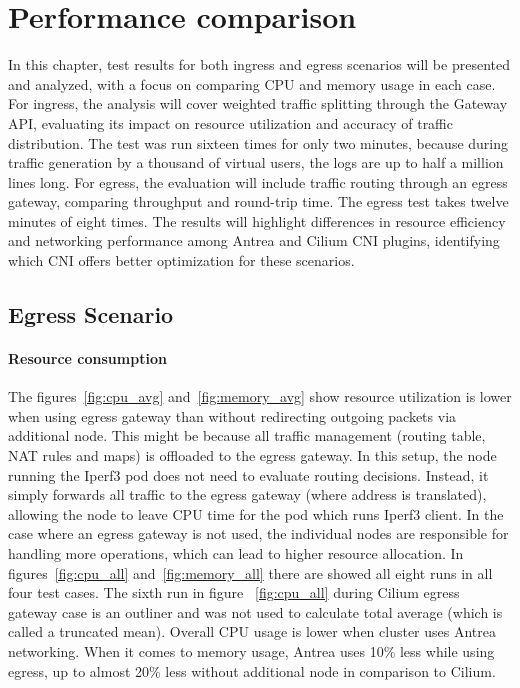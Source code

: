 \chapter{Performance comparison}
\label{cha:performCompare}

In this chapter, test results for both ingress and egress scenarios will be presented and analyzed, with a focus on comparing CPU and memory usage in each case. For ingress, the analysis will cover weighted traffic splitting through the Gateway API, evaluating its impact on resource utilization and accuracy of traffic distribution. The test was run sixteen times for only two minutes, because during traffic generation by a thousand of virtual users, the logs are up to half a million lines long. For egress, the evaluation will include traffic routing through an egress gateway, comparing throughput and round-trip time. The egress test takes twelve minutes of eight times. The results will highlight differences in resource efficiency and networking performance among Antrea and Cilium CNI plugins, identifying which CNI offers better optimization for these scenarios.


\section{Egress Scenario}
\label{sec:egressComparison}

\subsubsection{Resource consumption}
\label{sec:egressResoureComsumption}



The figures~\ref{fig:cpu_avg} and~\ref{fig:memory_avg} show resource utilization is lower when using egress gateway than without redirecting outgoing packets via additional node. This might be because all traffic management (routing table, NAT rules and maps) is offloaded to the egress gateway. In this setup, the node running the Iperf3 pod does not need to evaluate routing decisions. Instead, it simply forwards all traffic to the egress gateway (where address is translated), allowing the node to leave CPU time for the pod which runs Iperf3 client. In the case where an egress gateway is not used, the individual nodes are responsible for handling more operations, which can lead to higher resource allocation. In figures~\ref{fig:cpu_all} and~\ref{fig:memory_all} there are showed all eight runs in all four test cases. The sixth run in figure ~\ref{fig:cpu_all} during Cilium egress gateway case is an outliner and was not used to calculate total average (which is called a truncated mean). Overall CPU usage is lower when cluster uses Antrea networking. When it comes to memory usage, Antrea uses 10\% less while using egress, up to almost 20\% less without additional node in comparison to Cilium.

